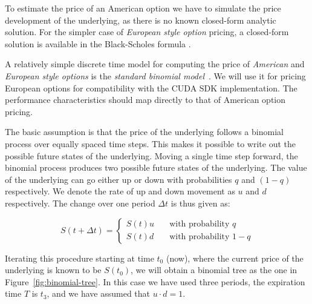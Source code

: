 \documentclass[preprint]{sigplanconf}
\begin{document}
To estimate the price of an American option we have to simulate the
price development of the underlying, as there is no known closed-form
analytic solution. For the simpler case of \emph{European style
  option} pricing, a closed-form solution is available in the
Black-Scholes formula \cite{black1973pricing}. 

A relatively simple discrete time model for computing the price of
\emph{American} and \emph{European style options} is the
\emph{standard binomial model}~\cite{cox1979option}.  We will use it
for pricing European options for compatibility with the CUDA SDK
implementation. The performance characteristics should map directly to
that of American option pricing.

The basic assumption is that the price of the underlying follows a
binomial process over equally spaced time steps. This makes it
possible to write out the possible future states of the
underlying. Moving a single time step forward, the binomial process
produces two possible future states of the underlying. The value of
the underlying can go either up or down with probabilities $q$ and $(1
- q)$ respectively. We denote the rate of up and down movement as $u$
and $d$ respectively. The change over one period $\Delta t$ is thus
given as:

\begin{equation}
S(t+\Delta t) = \left\{
  \begin{array}{ll}
    S(t)u & \quad \textrm{with probability $q$} \\
    S(t)d & \quad \textrm{with probability $1-q$}
  \end{array} \right.
\end{equation}

Iterating this procedure starting at time $t_0$ (now), where the
current price of the underlying is known to be $S(t_0)$, we will
obtain a binomial tree as the one in
Figure~\ref{fig:binomial-tree}. In this case we have used three
periods, the expiration time $T$ is $t_3$, and we have assumed that
$u\cdot d = 1$.
\end{document}
